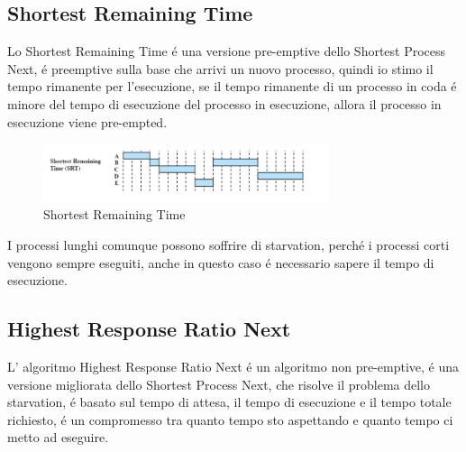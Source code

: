 \documentclass[11pt]{article}
\begin{document}
    \subsection{Shortest Remaining Time}
    Lo Shortest Remaining Time é una versione pre-emptive dello Shortest Process Next, é preemptive sulla base che arrivi
    un nuovo processo, quindi io stimo il tempo rimanente per l'esecuzione, se il tempo rimanente di un processo in coda é minore
    del tempo di esecuzione del processo in esecuzione, allora il processo in esecuzione viene pre-empted.
    \begin{figure}[H]
        \centering
        \includegraphics[width=0.75\textwidth]{immagini/SRT}
        \caption{Shortest Remaining Time}
    \end{figure}
    I processi lunghi comunque possono soffrire di starvation, perché i processi corti vengono sempre eseguiti, anche in
    questo caso é necessario sapere il tempo di esecuzione.
    \subsection{Highest Response Ratio Next}
    L' algoritmo Highest Response Ratio Next é un algoritmo non pre-emptive, é una versione migliorata dello Shortest Process Next,
    che risolve il problema dello starvation, é basato sul tempo di attesa, il tempo di esecuzione e il tempo totale richiesto,
    é un compromesso tra quanto tempo sto aspettando e quanto tempo ci metto ad eseguire.
\end{document}
